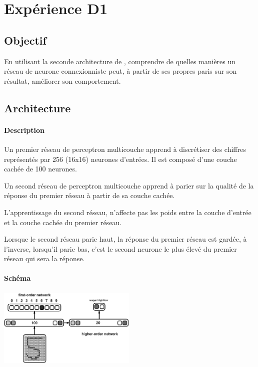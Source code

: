 \section{Expérience D1} 
  \subsection{Objectif}
    En utilisant la seconde architecture de \cite{Cleeremans_2007}, 
    comprendre de quelles manières un réseau de neurone connexionniste peut, à partir de ses propres paris
    sur son résultat, améliorer son comportement.
  
  
     
  \subsection{Architecture}
    \paragraph{Description}
      Un premier réseau de perceptron multicouche apprend à discrétiser des chiffres représentés
      par 256 (16x16) neurones d'entrées. Il est composé d'une couche cachée de 100 neurones.
      
      Un second réseau de perceptron multicouche apprend à parier sur la qualité de la réponse
      du premier réseau à partir de sa couche cachée.
      
      L'apprentissage du second réseau, n'affecte pas les poids entre la couche d'entrée et la 
      couche cachée du premier réseau.
      
      Lorsque le second réseau parie haut, la réponse du premier réseau est gardée, à l'inverse,
      lorsqu'il parie bas, c'est le second neurone le plus élevé du premier réseau qui sera 
      la réponse.


    \paragraph{Schéma}
      \begin{center}
	\includegraphics[width=250px]{data/expD1/schema.png}
      \end{center}
      
